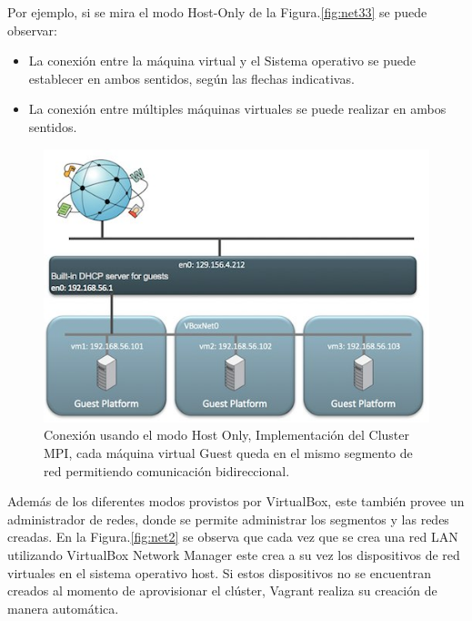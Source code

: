 \documentclass[letterpaper, 12pt, oneside]{article}
\begin{document}
    Por ejemplo, si se mira el modo Host-Only de la Figura.\ref{fig:net33} se puede observar: 
    \begin{itemize}
        \item La conexión entre la máquina virtual y el Sistema operativo se puede establecer en ambos sentidos, según las flechas indicativas. 
        \item La conexión entre múltiples máquinas virtuales se puede realizar en ambos sentidos.
    \end{itemize}
    
    \begin{center}
         \begin{figure}[H]
            \includegraphics[scale=1.4]{img/networking/host_only.jpg}
            \caption{Conexión usando el modo Host Only, Implementación del Cluster MPI, cada máquina virtual Guest queda en el mismo segmento de red permitiendo comunicación bidireccional.}
            \label{fig:net21}
        \end{figure}
    \end{center}
   
   Además de los diferentes modos provistos por VirtualBox, este también provee un administrador de redes, donde se permite administrar los segmentos y las redes creadas. En la Figura.\ref{fig:net2} se observa que cada vez que se crea una red LAN utilizando VirtualBox Network Manager este crea a su vez los dispositivos de red virtuales en el sistema operativo host. Si estos dispositivos no se encuentran creados al momento de aprovisionar el clúster, Vagrant realiza su creación de manera automática.
    
\end{document}
